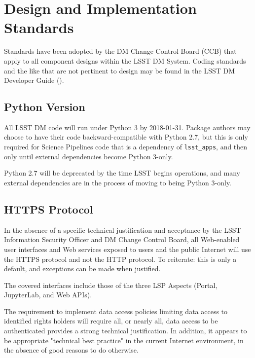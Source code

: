 \section{Design and Implementation Standards}\label{design-implementation-standards}

Standards have been adopted by the DM Change Control Board (CCB) that apply to
all component designs within the LSST DM System.  Coding standards and the like
that are not pertinent to design may be found in the LSST DM Developer Guide
(\citep{DevGuide}).

\subsection{Python Version}

All LSST DM code will run under Python 3 by 2018-01-31.  Package authors may
choose to have their code backward-compatible with Python 2.7, but this is only
required for Science Pipelines code that is a dependency of \texttt{lsst\_apps}, and then only until external dependencies become Python 3-only.

Python 2.7 will be deprecated by the time LSST begins operations, and many
external dependencies are in the process of moving to being Python 3-only.

\subsection{HTTPS Protocol}

In the absence of a specific technical justification and acceptance by the LSST
Information Security Officer and DM Change Control Board, all Web-enabled user
interfaces and Web services exposed to users and the public Internet will use
the HTTPS protocol and not the HTTP protocol.  To reiterate: this is only a
default, and exceptions can be made when justified.

The covered interfaces include those of the three LSP Aspects (Portal,
JupyterLab, and Web APIs).

The requirement to implement data access policies limiting data access to
identified rights holders will require all, or nearly all, data access to be
authenticated provides a strong technical justification.  In addition, it
appears to be appropriate "technical best practice" in the current Internet
environment, in the absence of good reasons to do otherwise.
